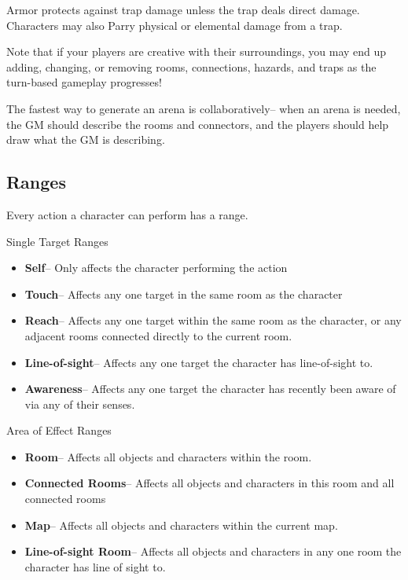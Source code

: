 Armor protects against trap damage unless the trap deals direct damage. Characters may also Parry physical or elemental damage from a trap.

Note that if your players are creative with their surroundings, you may end up adding, changing, or removing rooms, connections, hazards, and traps as the turn-based gameplay progresses!

The fastest way to generate an arena is collaboratively-- when an arena is needed, the GM should describe the rooms and connectors, and the players should help draw what the GM is describing.

\subsection{Ranges}

Every action a character can perform has a range.

\begin{GRPquicknote}

{\large Single Target Ranges}
\begin{itemize}
	\item \textbf{Self}-- Only affects the character performing the action
	\item \textbf{Touch}-- Affects any one target in the same room as the character
	\item \textbf{Reach}-- Affects any one target within the same room as the character, or any adjacent rooms connected directly to the current room.
	\item \textbf{Line-of-sight}-- Affects any one target the character has line-of-sight to.
	\item \textbf{Awareness}-- Affects any one target the character has recently been aware of via any of their senses.
\end{itemize}

{\large Area of Effect Ranges}
\begin{itemize}
	\item \textbf{Room}-- Affects all objects and characters within the room.
	\item \textbf{Connected Rooms}-- Affects all objects and characters in this room and all connected rooms
	\item \textbf{Map}-- Affects all objects and characters within the current map.
	\item \textbf{Line-of-sight Room}-- Affects all objects and characters in any one room the character has line of sight to.
\end{itemize}
\end{GRPquicknote}

